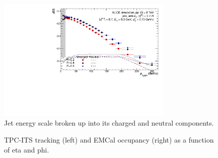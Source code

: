 \begin{figure}[h!]
    \centering
    \includegraphics[width=0.75\textwidth]{figures/EnergyScale/ROrdering/JES_8_3_ChNe.pdf}
    \caption{Jet energy scale broken up into its charged and neutral components.}
    \label{fig:eScaleChNe}
\end{figure}

\begin{figure}[h!]
    \centering
    \caption{TPC-ITS tracking (left) and EMCal occupancy (right) as a function of eta and phi.}
    \label{fig:eScaleTracksClusters}
\end{figure}
